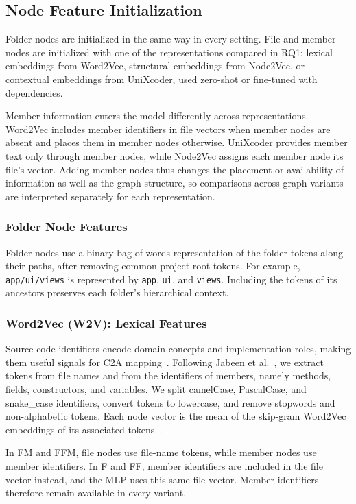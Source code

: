 \subsection{Node Feature Initialization \label{sec:node_features}}
Folder nodes are initialized in the same way in every setting. File and member nodes are initialized with one of the representations compared in RQ1: lexical embeddings from Word2Vec, structural embeddings from Node2Vec, or contextual embeddings from UniXcoder, used zero-shot or fine-tuned with dependencies.

Member information enters the model differently across representations. Word2Vec includes member identifiers in file vectors when member nodes are absent and places them in member nodes otherwise. UniXcoder provides member text only through member nodes, while Node2Vec assigns each member node its file's vector. Adding member nodes thus changes the placement or availability of information as well as the graph structure, so comparisons across graph variants are interpreted separately for each representation.

\subsubsection{Folder Node Features}
Folder nodes use a binary bag-of-words representation of the folder tokens along their paths, after removing common project-root tokens. For example, \texttt{app/ui/views} is represented by \texttt{app}, \texttt{ui}, and \texttt{views}. Including the tokens of its ancestors preserves each folder's hierarchical context.

\subsubsection{Word2Vec (W2V): Lexical Features\label{sec:node_w2v}}
Source code identifiers encode domain concepts and implementation roles, making them useful signals for C2A mapping~\cite{sarif}. Following Jabeen et al.~\citep{gaer}, we extract tokens from file names and from the identifiers of members, namely methods, fields, constructors, and variables. We split camelCase, PascalCase, and snake\_case identifiers, convert tokens to lowercase, and remove stopwords and non-alphabetic tokens. Each node vector is the mean of the skip-gram Word2Vec embeddings of its associated tokens~\cite{word2vec}.

In FM and FFM, file nodes use file-name tokens, while member nodes use member identifiers. In F and FF, member identifiers are included in the file vector instead, and the MLP uses this same file vector. Member identifiers therefore remain available in every variant.

